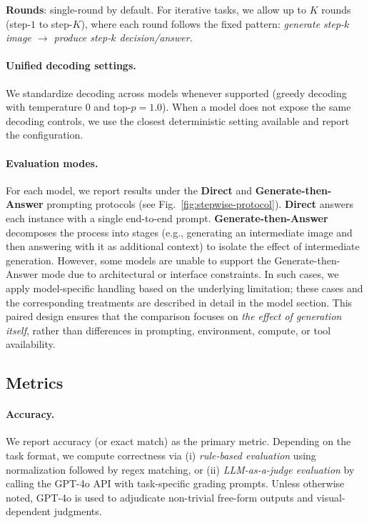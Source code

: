 \documentclass{article}
\theoremstyle{plain}
\theoremstyle{definition}
\theoremstyle{remark}
\begin{document}
\textbf{Rounds}: single-round by default. For iterative tasks, we allow up to $K$ rounds (step-$1$ to step-$K$), where each round follows the fixed pattern: \textit{generate step-$k$ image $\rightarrow$ produce step-$k$ decision/answer}.

\paragraph{Unified decoding settings.}
We standardize decoding across models whenever supported (greedy decoding with temperature $0$ and top-$p{=}1.0$). When a model does not expose the same decoding controls, we use the closest deterministic setting available and report the configuration.

\paragraph{Evaluation modes.}
For each model, we report results under the \textbf{Direct} and \textbf{Generate-then-Answer } prompting protocols (see Fig.~\ref{fig:stepwise-protocol}). \textbf{Direct} answers each instance with a single end-to-end prompt. \textbf{Generate-then-Answer } decomposes the process into stages (e.g., generating an intermediate image and then answering with it as additional context) to isolate the effect of intermediate generation. However, some models are unable to support the Generate-then-Answer  mode due to architectural or interface constraints. In such cases, we apply model-specific handling based on the underlying limitation; these cases and the corresponding treatments are described in detail in the model section. This paired design ensures that the comparison focuses on \emph{the effect of generation itself}, rather than differences in prompting, environment, compute, or tool availability.

\subsection{Metrics}
\label{sec:metrics}

\paragraph{Accuracy.}
We report accuracy (or exact match) as the primary metric. Depending on the task format, we compute correctness via (i) \emph{rule-based evaluation} using normalization followed by regex matching, or (ii) \emph{LLM-as-a-judge evaluation} by calling the GPT-4o API with task-specific grading prompts. Unless otherwise noted, GPT-4o is used to adjudicate non-trivial free-form outputs and visual-dependent judgments.
\end{document}
